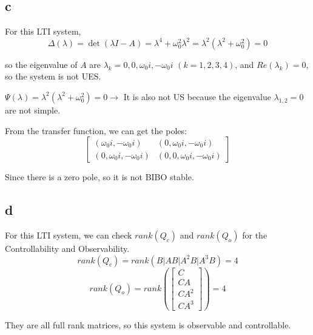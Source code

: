 \documentclass{article}
\begin{document}
\subsection{c}
For this LTI system, 
$$\Delta(\lambda) = \det (\lambda I - A) = \lambda^4 + \omega_0^2 \lambda^2 = \lambda^2 (\lambda^2 + \omega_0^2) = 0$$

so the eigenvalue of $A$ are $\lambda_k = 0, 0, \omega_0 i, -\omega_0 i$ $(k = 1,2,3,4)$, and $Re (\lambda_k) = 0$, so the system is not UES.

$\Psi(\lambda) = \lambda^2 (\lambda^2 + \omega_0^2) = 0 \rightarrow$ It is also not US because the eigenvalue $\lambda_{1,2} = 0$ are not simple.

From the transfer function, we can get the poles: 
$$\left[
 \begin{matrix}
   (\omega_0 i, - \omega_0 i) & (0, \omega_0 i, - \omega_0 i) \\
   (0, \omega_0 i, - \omega_0 i) & (0,0, \omega_0 i, - \omega_0 i)
  \end{matrix}
  \right]$$

Since there is a zero pole, so it is not BIBO stable.
\subsection{d}
For this LTI system, we can check $rank(Q_c)$ and $rank(Q_o)$ for the Controllability and Observability.
$$rank(Q_c) = rank(B | AB | A^2 B | A^3 B) = 4$$
$$rank(Q_o) = rank(\left[
 \begin{matrix}
    C \\
    CA \\
    CA^2 \\
    CA^3
  \end{matrix}
  \right]) = 4$$
  
They are all full rank matrices, so this system is observable and controllable.
\end{document}
